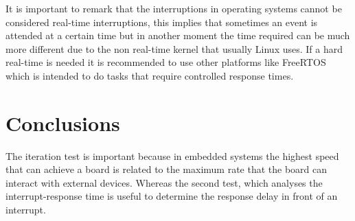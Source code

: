 It is important to remark that the interruptions in operating systems cannot be considered real-time interruptions, this implies that sometimes an event is attended at a certain time but in another moment the time required can be much more different due to the non real-time kernel that usually Linux uses. If a hard real-time is needed it is recommended to use other platforms like FreeRTOS which is intended to do tasks that require controlled response times.

\section{Conclusions}\label{S:PerformanceTests-Conclusions}
The iteration test is important because in embedded systems the highest speed that can achieve a board is related to the maximum rate that the board can interact with external devices. Whereas the second test, which analyses the interrupt-response time is useful to determine the response delay in front of an interrupt.